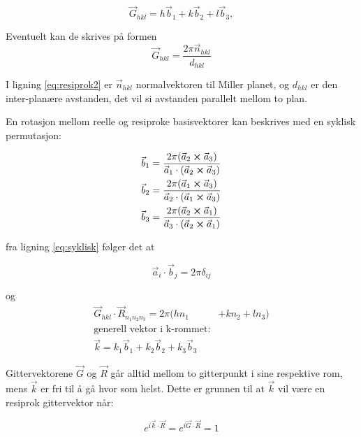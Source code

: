 \begin{equation}
    \label{eq:resiprok}
    \Vec{G}_{hkl} = h\Vec{b}_1 + k \Vec{b}_2 + l \Vec{b}_3,
\end{equation}

Eventuelt kan de skrives på formen 
\begin{equation}
\label{eq:resiprok2}
    \Vec{G}_{hkl} = \frac{2\pi \Vec{n}_{hkl}}{d_{hkl}}
\end{equation}

I ligning \ref{eq:resiprok2} er $\Vec{n}_{hkl}$ normalvektoren til Miller planet, og $d_{hkl}$ er den inter-planære avstanden, det vil si avstanden parallelt mellom to plan.

En rotasjon mellom reelle og resiproke basisvektorer kan beskrives med en syklisk permutasjon:

\begin{equation}
\label{eq:syklisk}
    \begin{split}
        \Vec{b}_1 &= \frac{2\pi (\Vec{a}_2 \cross \Vec{a}_3)}{\Vec{a}_1\cdot(\Vec{a}_2 \cross \Vec{a}_3)}\\
         \Vec{b}_2 &= \frac{2\pi (\Vec{a}_1 \cross \Vec{a}_3)}{\Vec{a}_2\cdot(\Vec{a}_1 \cross \Vec{a}_3)}\\
          \Vec{b}_3 &= \frac{2\pi (\Vec{a}_2 \cross \Vec{a}_1)}{\Vec{a}_3\cdot(\Vec{a}_2 \cross \Vec{a}_1)}
    \end{split}
\end{equation}

fra ligning \ref{eq:syklisk} følger det at 

\begin{equation*}
    \Vec{a}_i\cdot\Vec{b}_j = 2\pi\delta_{ij}
\end{equation*}

og 
\begin{equation*}
\begin{split}
    \Vec{G}_{hkl}\cdot \Vec{R}_{n_1n_2n_3} = 2\pi(hn_1&+kn_2+ln_3)\\
    \text{generell vektor i k-rommet}:\\
    \Vec{k} = k_1\Vec{b}_1 + k_2\Vec{b}_2 + k_3\Vec{b}_3
\end{split}
\end{equation*}

Gittervektorene $\Vec{G}$ og $\Vec{R}$ går alltid mellom to gitterpunkt i sine respektive rom, mens $\Vec{k}$ er fri til å gå hvor som helst. Dette er grunnen til at $\Vec{k}$ vil være en resiprok gittervektor når:

\begin{equation}
    \label{eq:kResi}
    e^{i\Vec{k}\cdot\Vec{R}} = e^{i\Vec{G}\cdot\Vec{R}} = 1
\end{equation}



